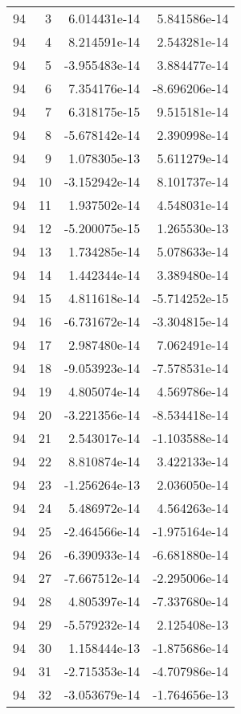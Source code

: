 \begin{tabular}{rrrr}
  94 &    3 &  6.014431e-14 &  5.841586e-14 \\
  94 &    4 &  8.214591e-14 &  2.543281e-14 \\
  94 &    5 & -3.955483e-14 &  3.884477e-14 \\
  94 &    6 &  7.354176e-14 & -8.696206e-14 \\
  94 &    7 &  6.318175e-15 &  9.515181e-14 \\
  94 &    8 & -5.678142e-14 &  2.390998e-14 \\
  94 &    9 &  1.078305e-13 &  5.611279e-14 \\
  94 &   10 & -3.152942e-14 &  8.101737e-14 \\
  94 &   11 &  1.937502e-14 &  4.548031e-14 \\
  94 &   12 & -5.200075e-15 &  1.265530e-13 \\
  94 &   13 &  1.734285e-14 &  5.078633e-14 \\
  94 &   14 &  1.442344e-14 &  3.389480e-14 \\
  94 &   15 &  4.811618e-14 & -5.714252e-15 \\
  94 &   16 & -6.731672e-14 & -3.304815e-14 \\
  94 &   17 &  2.987480e-14 &  7.062491e-14 \\
  94 &   18 & -9.053923e-14 & -7.578531e-14 \\
  94 &   19 &  4.805074e-14 &  4.569786e-14 \\
  94 &   20 & -3.221356e-14 & -8.534418e-14 \\
  94 &   21 &  2.543017e-14 & -1.103588e-14 \\
  94 &   22 &  8.810874e-14 &  3.422133e-14 \\
  94 &   23 & -1.256264e-13 &  2.036050e-14 \\
  94 &   24 &  5.486972e-14 &  4.564263e-14 \\
  94 &   25 & -2.464566e-14 & -1.975164e-14 \\
  94 &   26 & -6.390933e-14 & -6.681880e-14 \\
  94 &   27 & -7.667512e-14 & -2.295006e-14 \\
  94 &   28 &  4.805397e-14 & -7.337680e-14 \\
  94 &   29 & -5.579232e-14 &  2.125408e-13 \\
  94 &   30 &  1.158444e-13 & -1.875686e-14 \\
  94 &   31 & -2.715353e-14 & -4.707986e-14 \\
  94 &   32 & -3.053679e-14 & -1.764656e-13 \\

\end{tabular}
